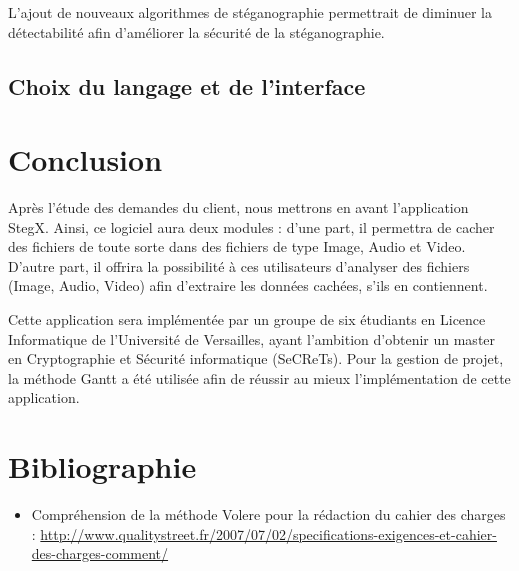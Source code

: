 \documentclass[11pt]{article}
\begin{document}
L'ajout de nouveaux algorithmes de stéganographie permettrait de diminuer la détectabilité afin d'améliorer la sécurité de la stéganographie. 

\subsection{Choix du langage et de l'interface}

\section{Conclusion}
Après l'étude des demandes du client, nous mettrons en avant l'application StegX. Ainsi, ce logiciel aura deux modules : d'une part, il permettra de cacher des fichiers de toute sorte dans 
des fichiers de type Image, Audio et Video. D'autre part, il offrira la possibilité à ces utilisateurs d'analyser des fichiers (Image, Audio, Video) afin d'extraire les données cachées, s'ils en 
contiennent. 

Cette application sera implémentée par un groupe de six étudiants en Licence Informatique de l'Université de Versailles, ayant l'ambition d'obtenir un master en Cryptographie et Sécurité informatique (SeCReTs). 
Pour la gestion de projet, la méthode Gantt a été utilisée afin de réussir au mieux l'implémentation de cette application. 

\newpage
\section{Bibliographie}
\begin {itemize}
\item Compréhension de la méthode Volere pour la rédaction du cahier des charges : \url{http://www.qualitystreet.fr/2007/07/02/specifications-exigences-et-cahier-des-charges-comment/}
\end{itemize}
\end{document}
